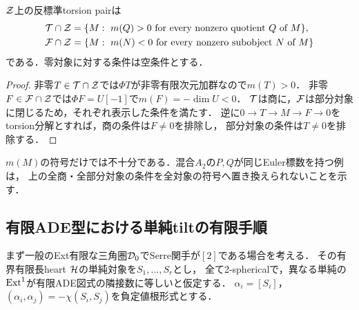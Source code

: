 \begin{proposition}\label{prop:numericaltorsion}
$\mathcal Z$上の反標準torsion pairは
\[
\begin{split}
 \mathcal T\cap\mathcal Z&=\{M:\ m(Q)>0\text{ for every nonzero quotient }Q\text{ of }M\},\\
 \mathcal F\cap\mathcal Z&=\{M:\ m(N)<0\text{ for every nonzero subobject }N\text{ of }M\}
\end{split}
\]
である．零対象に対する条件は空条件とする．
\end{proposition}
\begin{proof}
非零$T\in\mathcal T\cap\mathcal Z$では$\Phi T$が非零有限次元加群なので$m(T)>0$．
非零$F\in\mathcal F\cap\mathcal Z$では$\Phi F=U[-1]$で$m(F)=-\dim U<0$．
$\mathcal T$は商に，$\mathcal F$は部分対象に閉じるため，それぞれ表示した条件を満たす．
逆に$0\to T\to M\to F\to0$をtorsion分解とすれば，商の条件は$F\ne0$を排除し，
部分対象の条件は$T\ne0$を排除する．
\end{proof}
$m(M)$の符号だけでは不十分である．混合$A_2$の$P,Q$が同じEuler標数を持つ例は，
上の全商・全部分対象の条件を全対象の符号へ置き換えられないことを示す．

\subsection{有限ADE型における単純tiltの有限手順}
まず一般のExt有限な三角圏$\mathcal D_0$でSerre関手が$[2]$である場合を考える．
その有界有限長heart $\mathcal H$の単純対象を$S_1,\ldots,S_r$とし，
全て2-sphericalで，異なる単純の$\operatorname{Ext}^1$が有限ADE図式の隣接数に等しいと仮定する．
$\alpha_i=[S_i]$，$(\alpha_i,\alpha_j)=-\chi(S_i,S_j)$を負定値根形式とする．

